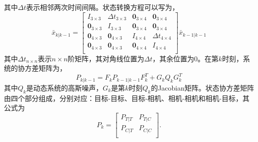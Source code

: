 其中$\Delta t$表示相邻两次时间间隔。状态转换方程可以写为，
\begin{equation}
\bar{x}_{k|k-1}=\left[\begin{matrix}
I_{3\times 3} & \Delta t_{3\times 3} & \textbf{0}_{3\times 4} & \textbf{0}_{3\times 4}\\
\textbf{0}_{3\times 3} & I_{3\times 3} & \textbf{0}_{3\times 4} & \textbf{0}_{3\times 4}\\
\textbf{0}_{4\times 3} & \textbf{0}_{4\times 3} & I_{4\times 4} & \Delta t_{4\times 4}\\
\textbf{0}_{4\times 3} & \textbf{0}_{4\times 3} & \textbf{0}_{4\times 4} & I_{4\times 4}\\
\end{matrix}\right]\bar{x}_{k-1|k-1}
\end{equation}
其中$\Delta t_{n \times n}$表示$n \times n$阶矩阵，其对角线位置为$\Delta t$，其余位置为0。在第$k$时刻，系统的协方差矩阵为，
\begin{equation}
P_{k|k-1}=F_kP_{k-1|k-1}F^T_k+G_kQ_kG^T_k
\end{equation}
其中$Q_k$是动态系统的高斯噪声，$G_k$是第$k$时刻$Q_k$的Jacobian矩阵。状态协方差矩阵由四个部分组成，分别对应：目标-目标、目标-相机、相机-相机和相机-目标，其公式为
\begin{equation}
P_k=\left[
\begin{matrix}
P_{T|T} & P_{T|C} \\
P_{C|T} & P_{C|C} \\
\end{matrix}\right].
\end{equation}
